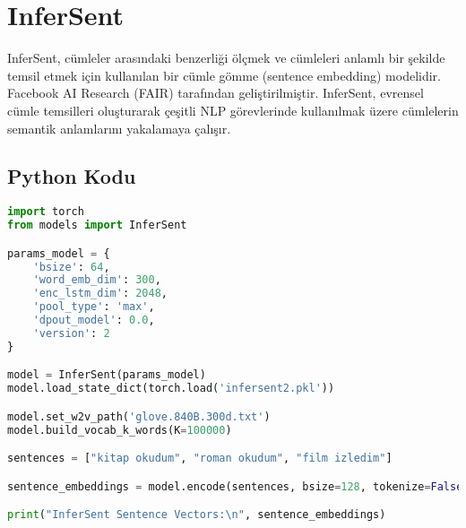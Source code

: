 \section{InferSent}

InferSent, cümleler arasındaki benzerliği ölçmek ve cümleleri anlamlı bir şekilde temsil etmek için kullanılan bir cümle gömme (sentence embedding) modelidir. Facebook AI Research (FAIR) tarafından geliştirilmiştir. InferSent, evrensel cümle temsilleri oluşturarak çeşitli NLP görevlerinde kullanılmak üzere cümlelerin semantik anlamlarını yakalamaya çalışır. 

\subsection{Python Kodu}

\begin{lstlisting}[language=Python]
import torch
from models import InferSent

params_model = {
    'bsize': 64,
    'word_emb_dim': 300,
    'enc_lstm_dim': 2048,
    'pool_type': 'max',
    'dpout_model': 0.0,
    'version': 2
}

model = InferSent(params_model)
model.load_state_dict(torch.load('infersent2.pkl'))

model.set_w2v_path('glove.840B.300d.txt')
model.build_vocab_k_words(K=100000)

sentences = ["kitap okudum", "roman okudum", "film izledim"]

sentence_embeddings = model.encode(sentences, bsize=128, tokenize=False)

print("InferSent Sentence Vectors:\n", sentence_embeddings)
\end{lstlisting}

\newpage